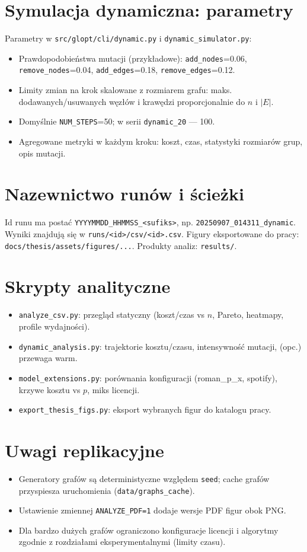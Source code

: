 \section{Symulacja dynamiczna: parametry}
Parametry w \texttt{src/glopt/cli/dynamic.py} i \texttt{dynamic\_simulator.py}:
\begin{itemize}
  \item Prawdopodobieństwa mutacji (przykładowe): \texttt{add\_nodes}=0.06, \texttt{remove\_nodes}=0.04, \texttt{add\_edges}=0.18, \texttt{remove\_edges}=0.12.
  \item Limity zmian na krok skalowane z rozmiarem grafu: maks. dodawanych/usuwanych węzłów i krawędzi proporcjonalnie do \(n\) i \(|E|\).
  \item Domyślnie \texttt{NUM\_STEPS}=50; w serii \texttt{dynamic\_20} — 100.
  \item Agregowane metryki w każdym kroku: koszt, czas, statystyki rozmiarów grup, opis mutacji.
\end{itemize}

\section{Nazewnictwo runów i ścieżki}
Id runu ma postać \texttt{YYYYMMDD\_HHMMSS\_<sufiks>}, np. \texttt{20250907\_014311\_dynamic}. Wyniki znajdują się w \texttt{runs/<id>/csv/<id>.csv}. Figury eksportowane do pracy: \texttt{docs/thesis/assets/figures/...}. Produkty analiz: \texttt{results/}.

\section{Skrypty analityczne}
\begin{itemize}
  \item \texttt{analyze\_csv.py}: przegląd statyczny (koszt/czas vs \(n\), Pareto, heatmapy, profile wydajności).
  \item \texttt{dynamic\_analysis.py}: trajektorie kosztu/czasu, intensywność mutacji, (opc.) przewaga warm.
  \item \texttt{model\_extensions.py}: porównania konfiguracji (roman\_p\_x, spotify), krzywe kosztu vs \(p\), miks licencji.
  \item \texttt{export\_thesis\_figs.py}: eksport wybranych figur do katalogu pracy.
\end{itemize}

\section{Uwagi replikacyjne}
\begin{itemize}
  \item Generatory grafów są deterministyczne względem \texttt{seed}; cache grafów przyspiesza uruchomienia (\texttt{data/graphs\_cache}).
  \item Ustawienie zmiennej \texttt{ANALYZE\_PDF=1} dodaje wersje PDF figur obok PNG.
  \item Dla bardzo dużych grafów ograniczono konfiguracje licencji i algorytmy zgodnie z rozdziałami eksperymentalnymi (limity czasu).
\end{itemize}
